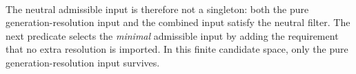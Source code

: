 \documentclass[11pt]{article}
\begin{document}
\begin{code}
\AgdaSymbol{:}\<%
\\
\>[0][@{}l@{\AgdaIndent{0}}]%
\>[2]\AgdaSpace{}%
\<%
\\
\>[0]\AgdaSpace{}%
\AgdaSymbol{=}\AgdaSpace{}%
\AgdaSpace{}%
\AgdaOperator{\AgdaInductiveConstructor{,}}\AgdaSpace{}%
\<%
\\
%
\\[\AgdaEmptyExtraSkip]%
\>[0]\AgdaSpace{}%
\AgdaSymbol{:}\<%
\\
\>[0][@{}l@{\AgdaIndent{0}}]%
\>[2]\AgdaSpace{}%
\<%
\\
\>[0]\AgdaSpace{}%
\AgdaSymbol{=}\AgdaSpace{}%
\AgdaSpace{}%
\AgdaOperator{\AgdaInductiveConstructor{,}}\AgdaSpace{}%
\<%
\end{code}

The neutral admissible input is therefore not a singleton: both the
pure generation-resolution input and the combined input satisfy the
neutral filter.  The next predicate selects the \emph{minimal}
admissible input by adding the requirement that no extra resolution is
imported.  In this finite candidate space, only the pure
generation-resolution input survives.
\end{document}
